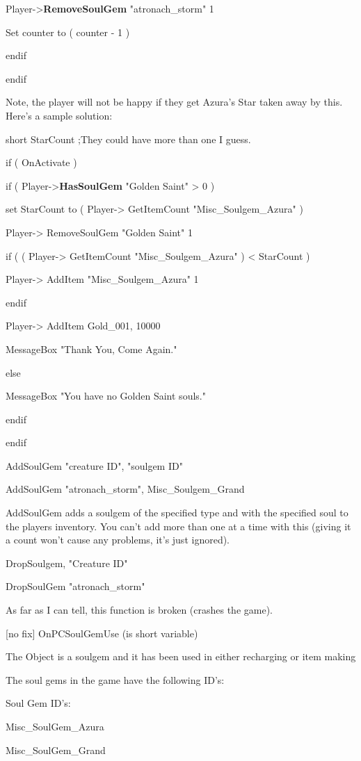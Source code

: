 Player->\textbf{RemoveSoulGem} "atronach\_storm" 1

Set counter to ( counter - 1 )

endif

endif

Note, the player will not be happy if they get Azura's Star taken away
by this. Here's a sample solution:

short StarCount ;They could have more than one I guess.

if ( OnActivate )

if ( Player->\textbf{HasSoulGem} "Golden Saint"
> 0 )

set StarCount to ( Player-> GetItemCount
"Misc\_Soulgem\_Azura" )

Player-> RemoveSoulGem "Golden Saint" 1

if ( ( Player-> GetItemCount "Misc\_Soulgem\_Azura" )
< StarCount )

Player-> AddItem "Misc\_Soulgem\_Azura" 1

endif

Player-> AddItem Gold\_001, 10000

MessageBox "Thank You, Come Again."

else

MessageBox "You have no Golden Saint souls."

endif

endif

AddSoulGem "creature ID", "soulgem ID"

AddSoulGem "atronach\_storm", Misc\_Soulgem\_Grand

AddSoulGem adds a soulgem of the specified type and with the specified
soul to the players inventory. You can't add more than one at a time
with this (giving it a count won't cause any problems, it's just
ignored).

DropSoulgem, "Creature ID"

DropSoulGem "atronach\_storm"

As far as I can tell, this function is broken (crashes the game).

{[}no fix{]} OnPCSoulGemUse (is short variable)

The Object is a soulgem and it has been used in either recharging or
item making

The soul gems in the game have the following ID's:

Soul Gem ID's:

Misc\_SoulGem\_Azura

Misc\_SoulGem\_Grand

